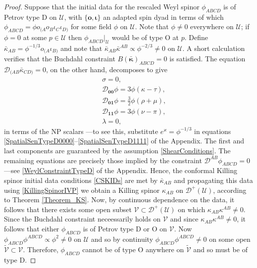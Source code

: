 \documentclass[10pt,a4paper]{article}
\theoremstyle{plain}
\def\bmo{{\bm o}}
\begin{document}
\begin{proof}
  Suppose that the initial data for the rescaled Weyl spinor
  $\phi_{ABCD}$ is of Petrov type D on $\mathcal{U}$, with
$\lbrace \bmo, \bm\iota\rbrace$ an adapted spin dyad in terms of which
$\phi_{ABCD}=\phi o_{(A}o_B\iota_C\iota_{D)}$ for some field
$\phi$ on $\mathcal{U}$. Note that $\phi\neq 0$ everywhere on $\mathcal{U}$; if
$\phi=0$ at some $p\in\mathcal{U}$ then $\phi_{ABCD}|_{\mathcal{U}}$ would be of type O
at $p$. Define $\bar{\kappa}_{AB}=\phi^{-1/3}o_{(A}\iota_{B)}$ and
note that $\bar{\kappa}_{AB}\bar{\kappa}^{AB}\propto\phi^{-2/3}\neq 0$
on $\mathcal{U}$. A short calculation verifies that the Buchdahl
constraint $B(\bar{\bm\kappa})_{ABCD}=0$ is satisfied. The equation
$\mathcal{D}_{(AB}\bar{\kappa}_{CD)}=0$, on the other hand, decomposes
to give
\begin{eqnarray*}
&& \sigma=0,\\
&& \mathcal{D}_{\bm0\bm0}\phi = 3\phi(\kappa - \tau), \\
&& \mathcal{D}_{\bm0\bm1}\phi = \tfrac{3}{2} \phi(\rho + \mu),\\
&& \mathcal{D}_{\bm1\bm1}\phi = 3\phi(\nu - \pi), \\
&& \lambda = 0,
\end{eqnarray*}
in terms of the NP scalars ---to see this, substitute
$e^{\varkappa}=\phi^{-1/3}$ in equations
\eqref{SpatialSenTypeD0000}--\eqref{SpatialSenTypeD1111} of the
Appendix.  The first and last components are guaranteed by the
assumption \eqref{ShearConditions}.  The remaining equations are
precisely those implied by the constraint
$\mathcal{D}^{AB}\phi_{ABCD}=0$ ---see \eqref{WeylConstraintTypeD} of
the Appendix.  Hence, the conformal Killing spinor initial data
conditions \eqref{CSKIDs} are met by $\bar{\kappa}_{AB}$ and
propagating this data using \eqref{KillingSpinorIVP} we obtain a Killing spinor
$\kappa_{AB}$ on $\mathcal{D}^+(\mathcal{U})$, according to Theorem
\ref{Theorem_KS}. Now, by continuous dependence on the data, it
follows that there exists some open subset
$\mathcal{V}\subset\mathcal{D}^+(\mathcal{U})$ on which
$\kappa_{AB}\kappa^{AB}\neq 0$. Since the Buchdahl constraint
neceessarily holds on $\mathcal{V}$ and since
$\kappa_{AB}\kappa^{AB}\neq 0$, it follows that either $\phi_{ABCD}$ is of
Petrov type D or O on $\mathcal{V}$. Now
$\phi_{ABCD}\phi^{ABCD}\propto \phi^2\neq 0$ on $\mathcal{U}$ and so
by continuity $\phi_{ABCD}\phi^{ABCD}\neq 0$ on some open
$\tilde{\mathcal{V}}\subset\mathcal{V}$. Therefore, $\phi_{ABCD}$ cannot
be of type O anywhere on $\tilde{\mathcal{V}}$ and so must be of type
D.
\end{proof}
\end{document}

